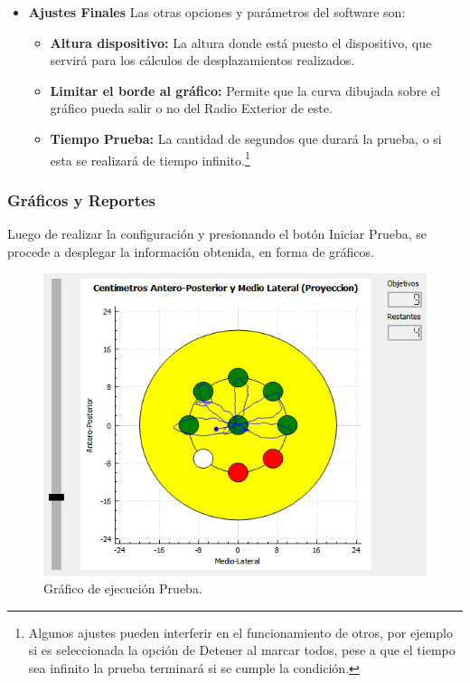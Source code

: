 \documentclass[12pt,a4paper]{article}
\begin{document}
\begin{itemize}
	\item \textbf{Ajustes Finales} Las otras opciones y parámetros del software son:
	\begin{itemize}
		\item \textbf{Altura dispositivo:} La altura donde está puesto el dispositivo, que servirá para los cálculos de desplazamientos realizados.
		\item \textbf{Limitar el borde al gráfico:} Permite que la curva dibujada sobre el gráfico pueda salir o no del Radio Exterior de este.
		\item \textbf{Tiempo Prueba:} La cantidad de segundos que durará la prueba, o si esta se realizará de tiempo infinito.\footnote{Algunos ajustes pueden interferir en el funcionamiento de otros, por ejemplo si es seleccionada la opción de Detener al marcar todos, pese a que el tiempo sea infinito la prueba terminará si se cumple la condición.}
	\end{itemize}
\end{itemize}


\newpage
\subsubsection{Gráficos y Reportes}
Luego de realizar la configuración y presionando el botón Iniciar Prueba, se procede a desplegar la información obtenida, en forma de gráficos.

\begin{figure}[H]
	\centering
	\includegraphics[scale=0.76]{images/graficosyreportes/graficoPrincipal}
	\caption{Gráfico de ejecución Prueba.}
	\label{fig:graficoPrincipal}
\end{figure}
\end{document}

